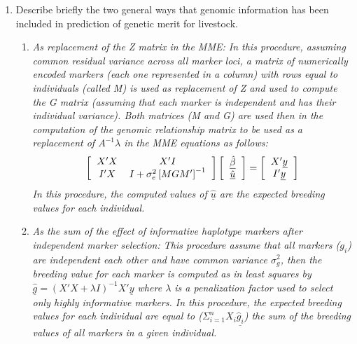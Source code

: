 \documentclass[12pt,a4paper]{paper}
\begin{document}
\begin{enumerate}
\item Describe briefly the two general ways that genomic information has been included in prediction of genetic merit for livestock.
\begin{enumerate}
\item \textit{As replacement of the Z matrix in the MME: In this procedure, assuming common residual variance across all marker loci, a matrix of numerically encoded markers (each one represented in a column) with rows equal to individuals (called M) is used as replacement of Z and used to compute the G matrix (assuming that each marker is independent and has their individual variance). Both matrices (M and G) are used then in the computation of the genomic relationship matrix to be used as a replacement of $A^{-1}\lambda$ in the MME equations as follows:}
\begin{equation}
\left[\begin{tabular}{cc}$X'X$&$X'I$\\$I'X$&$I + \sigma^{2}_{e}\left[MGM'\right]^{-1}$\end{tabular}\right]\left[\begin{tabular}{c}$\underline{\hat{\beta}}$\\$\underline{\hat{u}}$\end{tabular}\right] = \left[\begin{tabular}{c}$X'\underline{y}$\\$I'\underline{y}$\end{tabular}\right]
\end{equation}
\textit{In this procedure, the computed values of $\underline{\hat{u}}$ are the expected breeding values for each individual.}
\item \textit{As the sum of the effect of informative haplotype markers after independent marker selection: This procedure assume that all markers ($g_{i}$) are independent each other and have common variance $\sigma^{2}_{g}$, then the breeding value for each marker is computed as in least squares by $\underline{\hat{g}} = (X'X+ \lambda I)^{-1}X'\underline{y}$ where $\lambda$ is a penalization factor used to select only highly informative markers. In this procedure, the expected breeding values for each individual are equal to ($\Sigma_{i=1}^{n}X_{i}\underline{\hat{g}_{i}}$) the sum of the breeding values of all markers in a given individual.}
\end{enumerate}
\end{enumerate}
\end{document}
